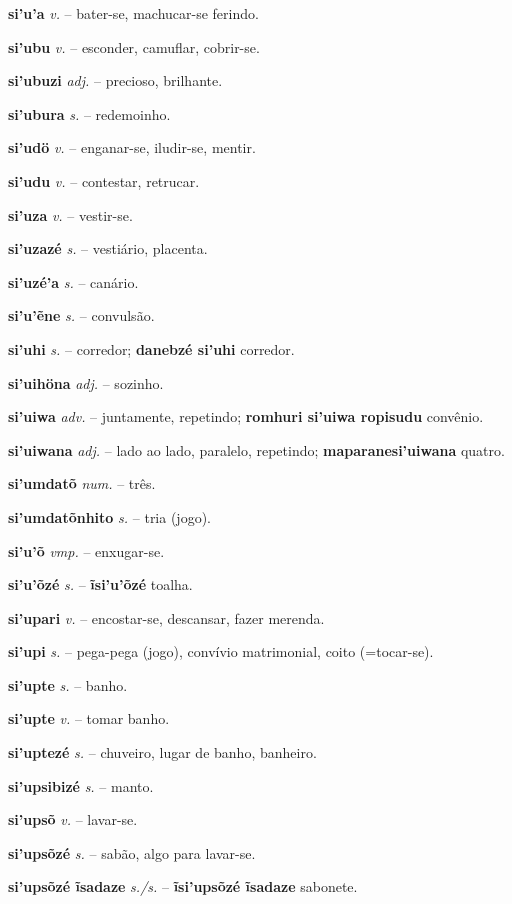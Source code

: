 \textbf{si'u'a} \textit{v.} -- bater-se, machucar-se ferindo.

\textbf{si'ubu} \textit{v.} -- esconder, camuflar, cobrir-se.

\textbf{si'ubuzi} \textit{adj.} -- precioso, brilhante.

\textbf{si'ubura} \textit{s.} -- redemoinho.

\textbf{si'udö} \textit{v.} -- enganar-se, iludir-se, mentir.

\textbf{si'udu} \textit{v.} -- contestar, retrucar.

\textbf{si'uza} \textit{v.} -- vestir-se.

\textbf{si'uzazé} \textit{s.} -- vestiário, placenta.

\textbf{si'uzé'a} \textit{s.} -- canário.

\textbf{si'u'ẽne} \textit{s.} -- convulsão.

\textbf{si'uhi} \textit{s.} -- corredor; \textbf{danebzé si'uhi} corredor.

\textbf{si'uihöna} \textit{adj.} -- sozinho.

\textbf{si'uiwa} \textit{adv.} -- juntamente, repetindo; \textbf{romhuri si'uiwa ropisudu} convênio.

\textbf{si'uiwana} \textit{adj.} -- lado ao lado, paralelo, repetindo; \textbf{maparanesi'uiwana} quatro.

\textbf{si'umdatõ} \textit{num.} -- três.

\textbf{si'umdatõnhito} \textit{s.} -- tria (jogo).

\textbf{si'u'õ} \textit{vmp.} -- enxugar-se.

\textbf{si'u'õzé} \textit{s.} -- \textbf{ĩsi'u'õzé} toalha.

\textbf{si'upari} \textit{v.} -- encostar-se, descansar, fazer merenda.

\textbf{si'upi} \textit{s.} -- pega-pega (jogo), convívio matrimonial, coito (=tocar-se).

\textbf{si'upte} \textit{s.} -- banho.

\textbf{si'upte} \textit{v.} -- tomar banho.

\textbf{si'uptezé} \textit{s.} -- chuveiro, lugar de banho, banheiro.

\textbf{si'upsibizé} \textit{s.} -- manto.

\textbf{si'upsõ} \textit{v.} -- lavar-se.

\textbf{si'upsõzé} \textit{s.} -- sabão, algo para lavar-se.

\textbf{si'upsõzé ĩsadaze} \textit{s./s.} -- \textbf{ĩsi'upsõzé ĩsadaze} sabonete.

